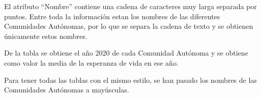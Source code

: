 \documentclass[
]{article}
\newenvironment{Shaded}{\begin{snugshade}}{\end{snugshade}}
\newcommand{\ControlFlowTok}[1]{\textcolor[rgb]{0.13,0.29,0.53}{\textbf{#1}}}
\newcommand{\DecValTok}[1]{\textcolor[rgb]{0.00,0.00,0.81}{#1}}
\newcommand{\FunctionTok}[1]{\textcolor[rgb]{0.13,0.29,0.53}{\textbf{#1}}}
\newcommand{\NormalTok}[1]{#1}
\newcommand{\OtherTok}[1]{\textcolor[rgb]{0.56,0.35,0.01}{#1}}
\newcommand{\SpecialCharTok}[1]{\textcolor[rgb]{0.81,0.36,0.00}{\textbf{#1}}}
\newcommand{\StringTok}[1]{\textcolor[rgb]{0.31,0.60,0.02}{#1}}
\begin{document}
El atributo ``Nombre'' contiene una cadena de caracteres muy larga
separada por puntos. Entre toda la información estan los nombres de las
diferentes Comunidades Autónomas, por lo que se separa la cadena de
texto y se obtienen únicamente estos nombres.

\begin{Shaded}
\end{Shaded}

De la tabla se obtiene el año 2020 de cada Comunidad Autónoma y se
obtiene como valor la media de la esperanza de vida en ese año.

Para tener todas las tablas con el mismo estilo, se han pasado los
nombres de las Comunidades Autónomas a mayúsculas.
\end{document}
